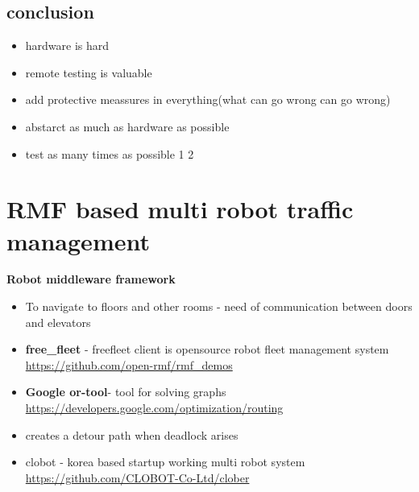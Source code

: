 \documentclass[a4paper]{article}
\begin{document}
\subsection{conclusion}
\begin{itemize}
    \item hardware is hard 
    \item remote testing is valuable
    \item add protective meassures in everything(what can go wrong can go wrong)
    \item abstarct as much as hardware as possible
    \item test as many times as possible 1 2
\end{itemize}
\section{RMF based multi robot traffic management}
\textbf{Robot middleware framework}
\begin{itemize}
        \item To navigate to floors and other rooms - need of communication between doors and elevators
        \item \textbf{free\_fleet} - freefleet client is opensource robot fleet management system \url{https://github.com/open-rmf/rmf_demos}
        \item \textbf{Google or-tool}- tool for solving graphs \url{https://developers.google.com/optimization/routing}
        \item creates a detour path when deadlock arises
        \item clobot - korea based startup working multi robot system \url{https://github.com/CLOBOT-Co-Ltd/clober}
\end{itemize}
\end{document}
